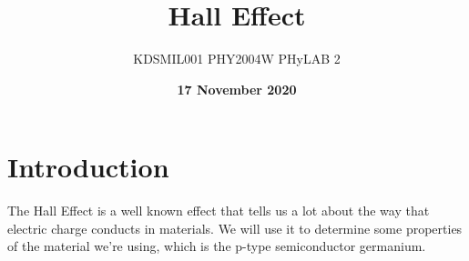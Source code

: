\documentclass[12pt]{article}
\title{Hall Effect}
\author{KDSMIL001 \; PHY2004W PHyLAB 2}
\date{\textbf{17 November 2020}}
\numberwithin{equation}{section}
\numberwithin{figure}{section}
\numberwithin{table}{section}
\begin{document}
    \begin{titlepage}
        \maketitle
        \center
        \tableofcontents
    \end{titlepage}
    
    \section{Introduction}\label{sec:Introduction}
    The Hall Effect is a well known effect that tells us a lot about the way that electric 
    charge conducts in materials. We will use it to determine some properties of the material 
    we're using, which is the p-type semiconductor germanium. 
\end{document}
